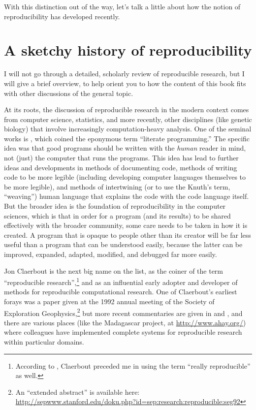 \documentclass{book}
\begin{document}
With this distinction out of the way, let's talk a little about how the notion of reproducibility has developed recently.
\section{A sketchy history of reproducibility}
\label{sec-2-2}

I will not go through a detailed, scholarly review of reproducible research, but I will give a brief overview, to help orient you to how the content of this book fits with other discussions of the general topic.

At its roots, the discussion of reproducible research in the modern context comes from computer science, statistics, and more recently, other disciplines (like genetic biology) that involve increasingly computation-heavy analysis. One of the seminal works is \textcite{knuth1984literate}, which coined the eponymous term ``literate programming.'' The specific idea was that good programs should be written with the \emph{human} reader in mind, not (just) the computer that runs the programs. This idea has lead to further ideas and developments in methods of documenting code, methods of writing code to be more legible (including developing computer languages themselves to be more legible), and methods of intertwining (or to use the Knuth's term, ``weaving'') human language that explains the code with the code language itself. But the broader idea is the foundation of reproducibility in the computer sciences, which is that in order for a program (and its results) to be shared effectively with the broader community, some care needs to be taken in how it is created. A program that is opaque to people other than its creator will be far less useful than a program that can be understood easily, because the latter can be improved, expanded, adapted, modified, and debugged far more easily.

Jon Claerbout is the next big name on the list, as the coiner of the term ``reproducible research'',\footnote{According to \cite{buckheit1995wavelab}, Claerbout preceded me in using the term ``really reproducible'' as well.
 } and as an influential early adopter and developer of methods for reproducible computational research.  One of Claerbout's earliest forays was a paper given at the 1992 annual meeting of the Society of Exploration Geophysics,\footnote{An ``extended abstract'' is available here:\\ \href{http://sepwww.stanford.edu/doku.php?id=sep:research:reproducible:seg92}{http://sepwww.stanford.edu/doku.php?id=sep:research:reproducible:seg92}
 } but more recent commentaries are given in \textcite{schwab2000making} and \textcite{fomel2009reproducible}, and there are various places (like the Madagascar project, at \href{http://www.ahay.org/}{http://www.ahay.org/}) where colleagues have implemented complete systems for reproducible research within particular domains.
   
\end{document}

